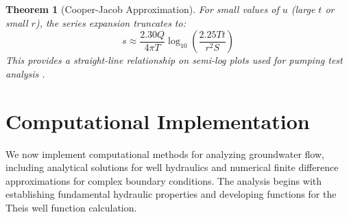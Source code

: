 \documentclass[a4paper, 11pt]{article}
\newtheorem{theorem}{Theorem}[section]
\begin{document}
\begin{theorem}[Cooper-Jacob Approximation]
For small values of $u$ (large $t$ or small $r$), the series expansion truncates to:
\begin{equation}
s \approx \frac{2.30Q}{4\pi T} \log_{10}\left(\frac{2.25Tt}{r^2 S}\right)
\end{equation}
This provides a straight-line relationship on semi-log plots used for pumping test analysis
\cite{cooper1946drawdown}.
\end{theorem}

\section{Computational Implementation}

We now implement computational methods for analyzing groundwater flow, including analytical
solutions for well hydraulics and numerical finite difference approximations for complex
boundary conditions. The analysis begins with establishing fundamental hydraulic properties
and developing functions for the Theis well function calculation.
\end{document}
